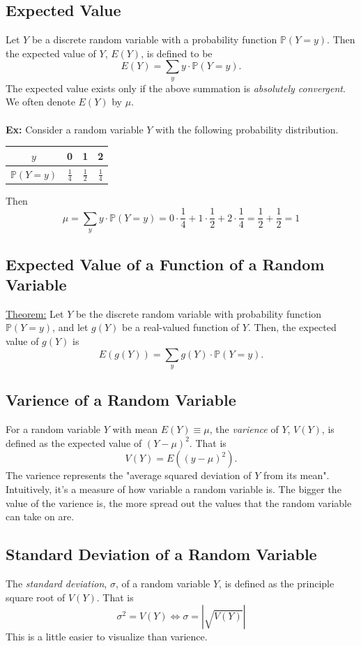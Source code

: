 \documentclass{article}
\newcommand{\ti}[1]{\textit{#1}}
\newcommand{\bbP}{\mathbb{P}}
\begin{document}
\subsection{Expected Value}
Let $Y$ be a discrete random variable with a probability function $\bbP(Y=y)$. Then the expected value of $Y$, $E(Y)$, is defined to be
\[E(Y) = \sum_{y} y\cdot \bbP(Y=y).\]
The expected value exists only if the above summation is \ti{absolutely convergent}. We often denote $E(Y)$ by $\mu$.\\\\
\textbf{Ex:} Consider a random variable $Y$ with the following probability distribution.
\begin{center}
\begin{tabular}{| c || c | c | c|}
\hline
$y$ & 0 & 1 & 2\\
\hline
$\bbP(Y=y)$ & $\frac{1}{4}$ & $\frac{1}{2}$ & $\frac{1}{4}$\\
\hline
\end{tabular}
\end{center}
Then
\[\mu = \sum_{y} y\cdot \bbP(Y=y) = 0\cdot \frac{1}{4} + 1\cdot \frac{1}{2} + 2\cdot \frac{1}{4} = \frac{1}{2} + \frac{1}{2} = 1\]
\subsection{Expected Value of a Function of a Random Variable}
\underline{Theorem:} Let $Y$ be the discrete random variable with probability function $\bbP(Y=y)$, and let $g(Y)$ be a real-valued function of $Y$. Then, the expected value of $g(Y)$ is
\[E(g(Y)) = \sum_{y} g(Y)\cdot \bbP(Y=y).\]
\subsection{Varience of a Random Variable}
For a random variable $Y$ with mean $E(Y) \equiv \mu$, the \ti{varience} of $Y$, $V(Y)$, is defined as the expected value of $(Y - \mu)^{2}$. That is
\[V(Y) = E((y-\mu)^{2}).\]
The varience represents the "average squared deviation of $Y$ from its mean". Intuitively, it's a measure of how variable a random variable is. The bigger the value of the varience is, the more spread out the values that the random variable can take on are.
\subsection{Standard Deviation of a Random Variable}
The \ti{standard deviation}, $\sigma$, of a random variable $Y$, is defined as the principle square root of $V(Y)$. That is
\[\sigma^{2} = V(Y) \iff \sigma = |\sqrt{V(Y)}|\]
This is a little easier to visualize than varience.
\end{document}
